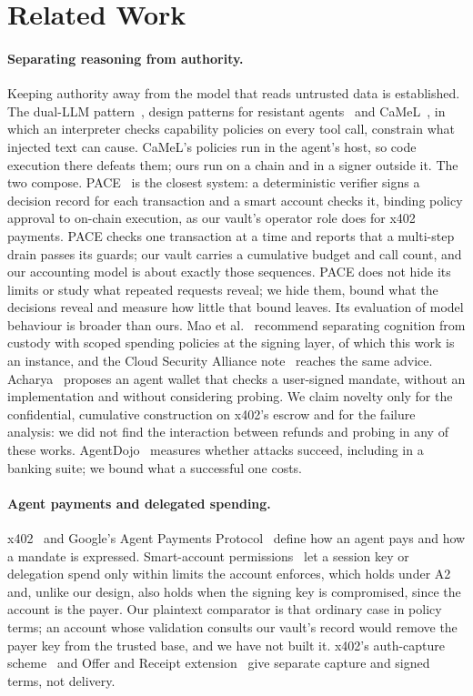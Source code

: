 \section{Related Work}
\label{sec:related}

\paragraph{Separating reasoning from authority.} Keeping authority away from the model that reads untrusted data is established. The dual-LLM
pattern~\cite{willison}, design patterns for resistant agents~\cite{patterns} and CaMeL~\cite{camel}, in which an interpreter checks capability
policies on every tool call, constrain what injected text can cause. CaMeL's policies run in the agent's host, so code execution there defeats them;
ours run on a chain and in a signer outside it. The two compose. PACE~\cite{pace} is the closest system: a deterministic verifier signs a decision record
for each transaction and a smart account checks it, binding policy approval to on-chain execution, as our vault's operator role does for x402 payments.
PACE checks one transaction at a time and reports that a multi-step drain passes its guards; our vault carries a cumulative budget and call count, and our
accounting model is about exactly those sequences. PACE does not hide its limits or study what repeated requests reveal; we hide them, bound what the
decisions reveal and measure how little that bound leaves. Its evaluation of model behaviour is broader than ours. Mao et al.~\cite{mao2026} recommend
separating cognition from custody with scoped spending policies at the signing layer, of which this work is an instance, and the Cloud Security Alliance
note~\cite{csa2026} reaches the same advice. Acharya~\cite{acharya2025} proposes an agent wallet that checks a user-signed mandate, without an implementation
and without considering probing. We claim novelty only for the confidential, cumulative construction on x402's escrow and for the failure analysis: we did
not find the interaction between refunds and probing in any of these works. AgentDojo~\cite{agentdojo} measures whether attacks succeed, including in a
banking suite; we bound what a successful one costs.

\paragraph{Agent payments and delegated spending.} x402~\cite{x402} and Google's Agent Payments Protocol~\cite{ap2} define how an agent pays and how a
mandate is expressed. Smart-account permissions~\cite{erc4337,erc7715,erc7710} let a session key or delegation spend only within limits the account enforces,
which holds under A2 and, unlike our design, also holds when the signing key is compromised, since the account is the payer. Our plaintext comparator is that
ordinary case in policy terms; an account whose validation consults our vault's record would remove the payer key from the trusted base, and we have not built
it. x402's auth-capture scheme~\cite{x402authcapture} and Offer and Receipt extension~\cite{x402offer} give separate capture and signed terms, not delivery.

